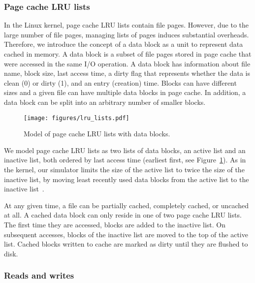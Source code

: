 \documentclass[conference]{IEEEtran}
\begin{document}
    \subsubsection{Page cache LRU lists}

    In the Linux kernel, page cache LRU lists contain file pages. However, 
    due to the large number of file pages, managing lists of pages 
    induces substantial overheads.
    Therefore, we introduce the concept of a data block as a unit to represent data 
    cached in memory. A data block is a subset of file pages stored in
    page cache that were accessed in the same I/O operation. 
    A data block has information about file name, block size, last access 
    time, a dirty flag that represents whether the data is clean (0) 
    or dirty (1), and an entry (creation) time.
    Blocks can have different sizes and a given file can have multiple 
    data blocks in page cache. In addition, a data block can be split into an 
    arbitrary number of smaller blocks.
    \begin{figure}
           \centering
           \texttt{[image: figures/lru\_lists.pdf]}
           \caption{Model of page cache LRU lists with data blocks.}    \label{fig:lrulist}
    \end{figure}    
    
    We model page cache LRU lists as 
    two lists of data blocks, an active list and an inactive list, both ordered by 
    last access time (earliest first, see Figure~\ref{fig:lrulist}).
    As in the kernel, our simulator limits the size of the active list to
    twice the size of the inactive list, by moving least recently 
    used data blocks from the active list to the inactive list~\cite{gorman2004understanding, linuxdev3rd2010}.

    At any given time, a file can be partially cached, completely cached,
    or uncached at all. A cached data block can only reside in one of two 
    page cache LRU lists. The first time they are accessed, blocks are
    added to the inactive list. On subsequent accesses, blocks of the
    inactive list are moved to the top of the active list. Cached blocks 
    written to cache are marked as dirty until they are flushed to disk.

    \subsubsection{Reads and writes}
\end{document}
